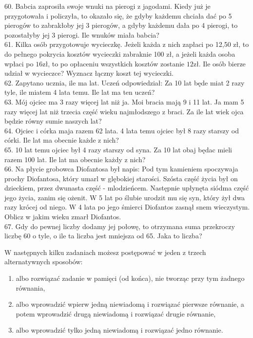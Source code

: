 \documentclass[10pt]{article}
\begin{document}
60. Babcia zaprosiła swoje wnuki na pierogi z jagodami. Kiedy już je przygotowała i policzyła, to okazało się, że gdyby każdemu chciała dać po 5 pierogów to zabrakłoby jej 3 pierogów, a gdyby każdemu dała po 4 pierogi, to pozostałyby jej 3 pierogi. Ile wnuków miała babcia?\\
61. Kilka osób przygotowuje wycieczkę. Jeżeli każda z nich zapłaci po 12,50 zł, to do pełnego pokrycia kosztów wycieczki zabraknie 100 zł, a jeżeli każda osoba wpłaci po \(16 \mathrm{zł}\), to po opłaceniu wszystkich kosztów zostanie \(12 \mathrm{zł}\). Ile osób bierze udział w wycieczce? Wyznacz łączny koszt tej wycieczki.\\
62. Zapytano ucznia, ile ma lat. Uczeń odpowiedział: Za 10 lat będe miat 2 razy tyle, ile miatem 4 lata temu. Ile lat ma ten uczeń?\\
63. Mój ojciec ma 3 razy więcej lat niż ja. Moi bracia mają 9 i 11 lat. Ja mam 5 razy więcej lat niż trzecia część wieku najmłodszego z braci. Za ile lat wiek ojca będzie równy sumie naszych lat?\\
64. Ojciec i córka maja razem 62 lata. 4 lata temu ojciec był 8 razy starszy od córki. Ile lat ma obecnie każde z nich?\\
65. 10 lat temu ojciec był 4 razy starszy od syna. Za 10 lat obaj będac mieli razem 100 lat. Ile lat ma obecnie każdy z nich?\\
66. Na płycie grobowca Diofantosa był napis: Pod tym kamieniem spoczywaja prochy Diofantosa, który umarl w glębokiej starości. Szósta część życia był on dzieckiem, przez dwunasta część - mlodzieńcem. Następnie upłynęta siódma część jego życia, zanim się ożenit. W 5 lat po ślubie urodzit mu się syn, który żył dwa razy krócej od niego. W 4 lata po jego śmierci Diofantos zasnął snem wieczystym. Oblicz w jakim wieku zmarł Diofantos.\\
67. Gdy do pewnej liczby dodamy jej połowę, to otrzymana suma przekroczy liczbę 60 o tyle, o ile ta liczba jest mniejsza od 65. Jaka to liczba?

W następnych kilku zadaniach możesz postępować w jeden z trzech alternatywnych sposobów:

\begin{enumerate}
  \item albo rozwiązać zadanie w pamięci (od końca), nie tworząc przy tym żadnego równania,
  \item albo wprowadzić wpierw jedną niewiadomą i rozwiązać pierwsze równanie, a potem wprowadzić drugą niewiadomą i rozwiązać drugie równanie,
  \item albo wprowadzić tylko jedną niewiadomą i rozwiązać jedno równanie.
\end{enumerate}
\end{document}
